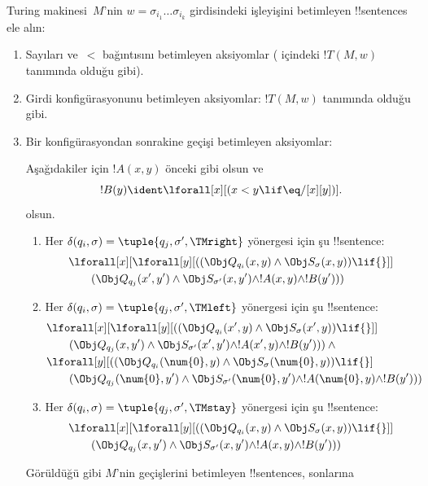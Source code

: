 \documentclass[../../../include/open-logic-section]{subfiles}
\begin{document}
Turing makinesi~$M$'nin $w=\sigma_{i_1}\dots\sigma_{i_k}$ girdisindeki
işleyişini betimleyen !!{sentence}s ele alın:
\begin{enumerate}
\item Sayıları ve~$<$ bağıntısını betimleyen aksiyomlar
( içindeki $!T(M,w)$ tanımında olduğu gibi).
\item Girdi konfigürasyonunu betimleyen aksiyomlar: $!T(M,w)$ tanımında
olduğu gibi.
\item Bir konfigürasyondan sonrakine geçişi betimleyen aksiyomlar:

Aşağıdakiler için $!A(x,y)$ önceki gibi olsun ve
\[
  !B(y) \ident \lforall[x][(x < y \lif \eq/[x][y])].
\]
olsun.
\begin{enumerate}
\item {} Her
$\delta(q_i,\sigma)=\tuple{q_j,\sigma',\TMright}$ yönergesi için şu
!!{sentence}:
\begin{align*}
& \lforall[x][\lforall[y][(
   (\Obj Q_{q_i}(x, y) \land \Obj S_{\sigma}(x, y)) \lif {}]] \\
&\qquad   (\Obj Q_{q_j}(x', y') \land \Obj S_{\sigma'}(x, y') \land
!A(x, y) \land !B(y')))
\end{align*}
\item {} Her
$\delta(q_i,\sigma)=\tuple{q_j,\sigma',\TMleft}$ yönergesi için şu
!!{sentence}:
\begin{align*}
& \lforall[x][\lforall[y][
    ((\Obj Q_{q_i}(x', y) \land \Obj S_{\sigma}(x', y)) \lif {}]]\\
& \qquad   (\Obj Q_{q_j}(x, y') \land \Obj S_{\sigma'}(x', y') \land
!A(x', y) \land !B(y'))) \land {}\\
& \lforall[y][((\Obj Q_{q_i}(\num{0}, y) \land \Obj S_{\sigma}(\num{0},
    y)) \lif {}]\\
& \qquad (\Obj Q_{q_j}(\num{0}, y') \land \Obj S_{\sigma'}(\num{0},
  y') \land !A(\num{0}, y) \land !B(y')))
\end{align*}
\item {} Her
$\delta(q_i,\sigma)=\tuple{q_j,\sigma',\TMstay}$ yönergesi için şu
!!{sentence}:
\begin{align*}
& \lforall[x][\lforall[y][(
   (\Obj Q_{q_i}(x, y) \land \Obj S_{\sigma}(x, y)) \lif {}]] \\
&\qquad (\Obj Q_{q_j}(x, y') \land \Obj S_{\sigma'}(x, y') \land
!A(x, y) \land !B(y')))
\end{align*}
\end{enumerate}
Görüldüğü gibi $M$'nin geçişlerini betimleyen !!{sentence}s, sonlarına

\end{enumerate}
\end{document}
